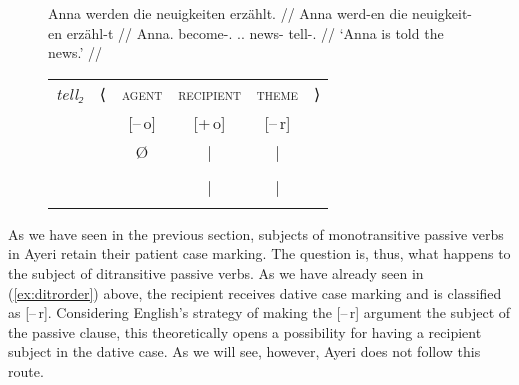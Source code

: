 \begin{figure}
\a\label{ex:gerditrpass_pass2}%
\begingl
	\gla Anna werden die neuigkeiten erzählt. //
	\glb Anna werd-en die neuigkeit-en erzähl-t //
	\glc Anna.\Dat{} become-\Tpl{}.\Prs{} \Def{}.\Nom{}.\Pl{} news-\Pl{}
		tell-\Pst{}.\Ptcp{} //
	\glft `Anna is told the news.' //
\endgl
\medskip\\
\begin{tabular}[t]{@{} >{\itshape}l l c c c r}
tell₂
	& ⟨
	& \textsc{agent}
	& \textsc{recipient}
	& \textsc{theme}
	& ⟩
	\\
%
	& %
	& [–\,o]
	& [+\,o]
	& [–\,r]
	& %
	\\

%
	& %
	& Ø
	& |
	& |
	& %
	\\

%
	& %
	& %
	& \Obj*
	& \Subj
	& %
	\\

%
	& %
	& %
	& |
	& |
	& %
	\\

%
	& %
	& %
	& \fw{Anna}
	& \fw{news}
	& %
	\\
\end{tabular}

\xe
\end{figure}

As we have seen in the previous section, subjects of monotransitive passive
verbs in Ayeri retain their patient case marking. The question is, thus, what
happens to the subject of ditransitive passive verbs. As we have already seen
in (\ref{ex:ditrorder}) above, the recipient receives dative case marking and
is classified as [–\,r]. Considering English's strategy of making the [–\,r]
argument the subject of the passive clause, this theoretically opens a
possibility for having a recipient subject in the dative case. As we will see,
however, Ayeri does not follow this route.

